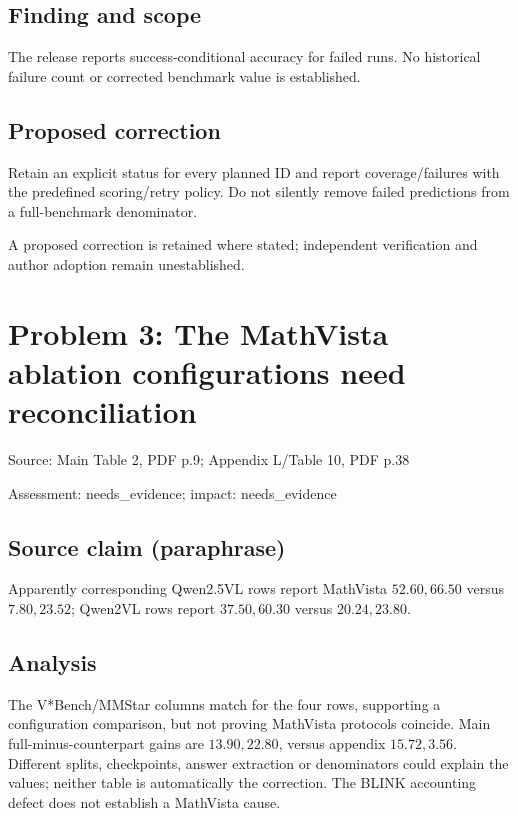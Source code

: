 \documentclass[11pt]{article}
\begin{document}
\subsection*{Finding and scope}

The release reports success-conditional accuracy for failed runs. No historical failure count or corrected benchmark value is established.

\subsection*{Proposed correction}

Retain an explicit status for every planned ID and report coverage/failures with the predefined scoring/retry policy. Do not silently remove failed predictions from a full-benchmark denominator.

A proposed correction is retained where stated; independent verification and author adoption remain unestablished.

\section*{Problem 3: The MathVista ablation configurations need reconciliation}

Source: Main Table 2, PDF p.9; Appendix L/Table 10, PDF p.38

Assessment: needs\_evidence; impact: needs\_evidence

\subsection*{Source claim (paraphrase)}

Apparently corresponding Qwen2.5VL rows report MathVista \(52.60,66.50\) versus \(7.80,23.52\); Qwen2VL rows report \(37.50,60.30\) versus \(20.24,23.80\).

\subsection*{Analysis}

The V*Bench/MMStar columns match for the four rows, supporting a configuration comparison, but not proving MathVista protocols coincide. Main full-minus-counterpart gains are \(13.90,22.80\), versus appendix \(15.72,3.56\). Different splits, checkpoints, answer extraction or denominators could explain the values; neither table is automatically the correction. The BLINK accounting defect does not establish a MathVista cause.
\end{document}
